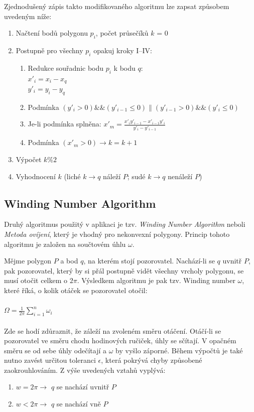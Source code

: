 \documentclass[a4paper, 12pt]{article}
\begin{document}
Zjednodušený zápis takto modifikovaného algoritmu lze zapsat způsobem uvedeným níže:
\begin{enumerate}
\item Načtení bodů polygonu $p_i$, počet průsečíků $k$ = 0
\item Postupně pro všechny $p_i$ opakuj kroky I–IV:
\begin{enumerate}[label=\Roman*.]
\item 	Redukce souřadnic bodu $p_i$ k bodu $q$:\\
$x'_i = x_i - x_q$\\
$y'_i = y_i - y_q$
\item 	Podmínka $(y'_i > 0)\&\&(y'_{i-1} \leq 0)\|(y'_{i-1} > 0)\&\&(y'_{i} \leq 0)$
\item 	Je-li podmínka splněna: $x'_m = \frac{x'_i y'_{i-1} - x'_{i-1} y'_i}{y'_i - y'_{i-1}}$
\item Podmínka $(x'_m > 0) \rightarrow k = k + 1$ 
\end{enumerate}
\item Výpočet $k\%2$
\item Vyhodnocení $k$ (liché $k \rightarrow q$ náleží $P$; sudé $k \rightarrow q$ nenáleží $P$)
\end{enumerate}

\subsection{Winding Number Algorithm}
Druhý algoritmus použitý v aplikaci je tzv. \textit{Winding Number Algorithm} neboli \textit{Metoda ovíjení}, který je vhodný pro nekonvexní polygony. Princip tohoto algoritmu je založen na součtovém úhlu $\omega$.

Mějme polygon $P$ a bod $q$, na kterém stojí pozorovatel. Nachází-li se $q$ uvnitř $P$, pak pozorovatel, který by si přál postupně vidět všechny vrcholy polygonu, se musí otočit celkem o $2\pi$. Výsledkem algoritmu je pak tzv. Winding number $\omega$, které říká, o kolik otáček se pozorovatel otočil: \\ \\
$\Omega = \frac{1}{2\pi} \sum_{i=1}^n \omega_i$\\ \\
Zde se hodí zdůraznit, že záleží na zvoleném směru otáčení. Otáčí-li se pozorovatel ve směru chodu hodinových ručiček, úhly se sčítají. V opačném směru se od sebe úhly odečítají a $\omega$ by vyšlo záporné. Během výpočtů je také nutno zavést určitou toleranci $\epsilon$, která pokrývá chyby způsobené zaokrouhlováním.
Z výše uvedených vztahů vyplývá:
\begin{enumerate} 
\item $w = 2\pi \rightarrow$ $q$ se nachází uvnitř $P$
\item  $w < 2\pi \rightarrow$ $q$ se nachází vně $P$
\end{enumerate}
\end{document}
